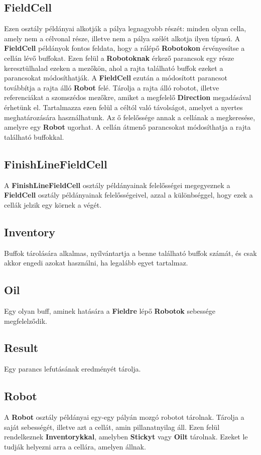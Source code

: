 \subsection{FieldCell}
Ezen osztály példányai alkotják a pálya legnagyobb részét: minden olyan cella, amely nem a célvonal része, illetve nem a pálya szélét alkotja ilyen típusú. A \textbf{FieldCell} példányok fontos feldata, hogy a rálépő \textbf{Robotokon} érvényesítse a cellán lévő buffokat. Ezen felül a \textbf{Robotoknak} érkező parancsok egy része keresztülhalad ezeken a mezőkön, ahol a rajta található buffok ezeket a parancsokat módosíthatják. A \textbf{FieldCell} ezután a módosított parancsot
továbbítja a rajta álló \textbf{Robot} felé.
Tárolja a rajta álló robotot, illetve referenciákat a szomszédos mezőkre, amiket a megfelelő \textbf{Direction} megadásával érhetünk el. Tartalmazza ezen felül a céltól való távolságot, amelyet a nyertes meghatározására használhatunk. Az ő felelőssége annak a cellának a megkeresése, amelyre egy \textbf{Robot} ugorhat. A cellán átmenő parancsokat módosíthatja a rajta található buffokkal.

\subsection{FinishLineFieldCell}
A \textbf{FinishLineFieldCell} osztály példányainak felelősségei megegyeznek a \textbf{FieldCell} osztály példányainak felelősségeivel, azzal a különbséggel, hogy ezek a cellák jelzik egy körnek a végét.

\subsection{Inventory}
Buffok tárolására alkalmas, nyílvántartja a benne található buffok számát, és csak akkor engedi azokat használni, ha legalább egyet tartalmaz.

\subsection{Oil}
Egy olyan buff, aminek hatására a \textbf{Fieldre} lépő \textbf{Robotok} sebessége megfelelződik.

\subsection{Result}
Egy parancs lefutásának eredményét tárolja.

\subsection{Robot}
A \textbf{Robot} osztály példányai egy-egy pályán mozgó robotot tárolnak. Tárolja a saját sebességét, illetve azt a cellát, amin pillanatnyilag áll. Ezen felül rendelkeznek \textbf{Inventorykkal}, amelyben \textbf{Stickyt} vagy \textbf{Oilt} tárolnak. Ezeket le tudják helyezni arra a cellára, amelyen állnak.

